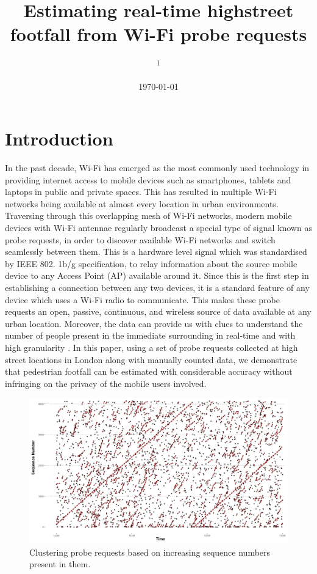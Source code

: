 \documentclass[11t, a4paper, twocolumn]{article}
\title{Estimating real-time highstreet  footfall from Wi-Fi probe requests}
\author{
	\authorstyle{
		Balamurugan Soundararaj\textsuperscript{1}, 
		James Cheshire\textsuperscript{1} and 
		Paul Longley\textsuperscript{1}}
	\newline\newline
	\textsuperscript{1}\institution{
		Department of Geography, 
		University College London, 
		United Kingdom}
}
\date{\today}
\begin{document}
	\maketitle
	\thispagestyle{firstpage}


	\section{Introduction}\label{intro}

		In the past decade, Wi-Fi has emerged as the most commonly used technology in providing internet access to mobile devices such as smartphones, tablets and laptops in public and private spaces.
		This has resulted in multiple Wi-Fi networks being available at almost every location in urban environments.
		Traversing through this overlapping mesh of Wi-Fi networks, modern mobile devices with Wi-Fi antennae regularly broadcast a special type of signal known as probe requests, in order to discover available Wi-Fi networks and switch seamlessly between them.
		This is a hardware level signal which was standardised by IEEE 802.
		1b/g specification, to relay information about the source mobile device to any Access Point (AP) available around it.
		Since this is the first step in establishing a connection between any two devices, it is a standard feature of any device which uses a Wi-Fi radio to communicate.
		This makes these probe requests an open, passive, continuous, and wireless source of data available at any urban location.
		Moreover, the data can provide us with clues to understand the number of people present in the immediate surrounding in real-time and with high granularity \citep{freud2015,konto2017}.
		In this paper, using a set of probe requests collected at high street locations in London along with manually counted data, we demonstrate that pedestrian footfall can be estimated with considerable accuracy without infringing on the privacy of the mobile users involved.
	
	\begin{figure}
		\begin{center}
			\includegraphics [width=\textwidth,trim=4 4 4 4,clip] {outputs/clustering_2.png}
			\caption{Clustering probe requests based on increasing sequence numbers present in them.}
			\label{clustering_pilot}
		\end{center}
	\end{figure}
\end{document}
